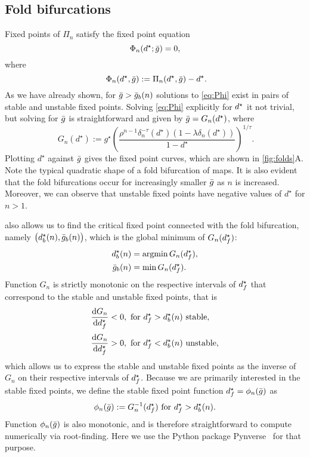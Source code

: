 \documentclass[../manuscript.tex]{subfiles}
\begin{document}
\subsection{Fold bifurcations}
Fixed points of $\Pi_n$ satisfy the fixed point equation
\begin{equation}
  \label{eq:Phi}
  \Phi_n(d^\star; \bar g)=0,
\end{equation}
where
\begin{equation}
  ~\label{eq:Phi-def}
  \Phi_{n}(d^{\star}, \bar g):=\Pi_{n}(d^{\star}, \bar g)-d^{\star}.
\end{equation}
As we have already shown, for $\bar g > \bar g_b(n)$ solutions to \cref{eq:Phi} exist in pairs of stable and unstable fixed points.
Solving \cref{eq:Phi} explicitly for $d^\star$ it not trivial, but solving for $\bar g$ is straightforward and given by $\bar g = G_n(d^\star)$, where
\begin{equation}
  ~\label{eq:g}
  G_{n}(d^{\star}) := g^{\star} \left(\frac{\rho^{n-1}\delta_{n}^{-\tau}(d^{\star})(1-\lambda\delta_{n}(d^{\star}))}{1-d^{\star}}\right)^{1/\tau}.
\end{equation}
Plotting $d^{\star}$ against $\bar g$ gives the fixed point curves, which are shown in \cref{fig:folds}A.
Note the typical quadratic shape of a fold bifurcation of maps.
It is also evident that the fold bifurcations occur for increasingly smaller $\bar g$ as $n$ is increased.
Moreover, we can observe that unstable fixed points have negative values of $d^{\star}$ for $n>1$.

 also allows us to find the critical fixed point connected with the fold bifurcation, namely $\big(d^\star_{b}(n), \bar g_{b}(n)\big)$, which is the global minimum of $G_{n}(d^\star_f)$:
\begin{align}
  d^\star_{b}(n) & = \operatorname{argmin} G_{n}(d^\star_{f}), \\
  \bar g_{b}(n)  & = \min{G_{n}(d^\star_{f})}.
\end{align}
Function $G_{n}$ is strictly monotonic on the respective intervals of $d^\star_f$ that correspond to the stable and unstable fixed points, that is
\begin{align}
  \dv{G_n}{d^\star_f} & < 0, \text{ for } d^\star_f>d^\star_b(n) \text{ stable},   \\[0.5ex]
  \dv{G_n}{d^\star_f} & > 0, \text{ for } d^\star_f<d^\star_b(n) \text{ unstable},
\end{align}
which allows us to express the stable and unstable fixed points as the inverse of $G_n$ on their respective intervals of $d^\star_f$.
Because we are primarily interested in the stable fixed points, we define the stable fixed point function $d^\star_f=\phi_n(\bar g)$ as
\begin{equation}
  \label{eq:phi}
  \phi_{n}(\bar g):= G_{n}^{-1}(d^\star_{f}) \text{ for } d^\star_{f}>d^\star_{b}(n).
\end{equation}
Function $\phi_n(\bar g)$ is also monotonic, and is therefore straightforward to compute numerically via root-finding.
Here we use the Python package Pynverse~\citep{pynverse} for that purpose.
\end{document}
